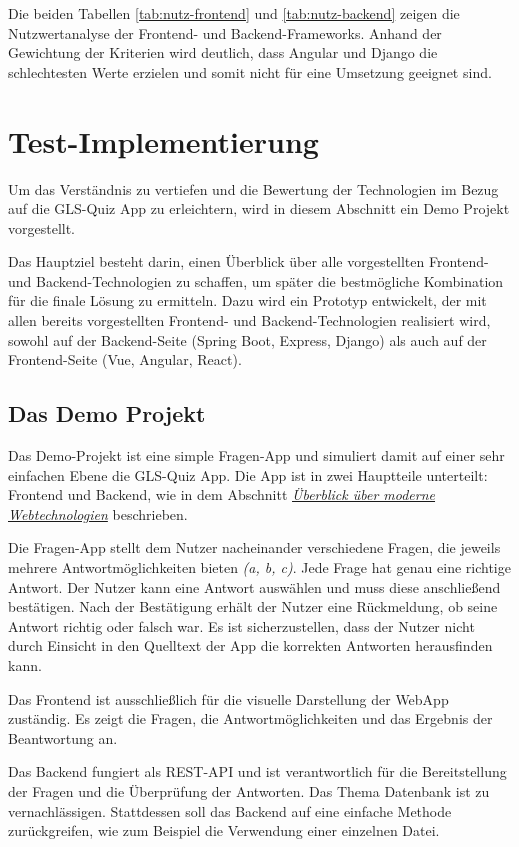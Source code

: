 \documentclass[biblatex]{lni}
\begin{document}
Die beiden Tabellen \ref{tab:nutz-frontend} und \ref{tab:nutz-backend} zeigen die Nutzwertanalyse der Frontend- und Backend-Frameworks.
Anhand der Gewichtung der Kriterien wird deutlich,
dass Angular und Django die schlechtesten Werte erzielen und somit nicht für eine Umsetzung geeignet sind.
\newpage

\section{Test-Implementierung}

Um das Verständnis zu vertiefen und die Bewertung der Technologien im Bezug auf die GLS-Quiz App zu erleichtern,
wird in diesem Abschnitt ein Demo Projekt vorgestellt.

Das Hauptziel besteht darin,
einen Überblick über alle vorgestellten Frontend- und Backend-Technologien zu schaffen,
um später die bestmögliche Kombination für die finale Lösung zu ermitteln.
Dazu wird ein Prototyp entwickelt, der mit allen bereits vorgestellten Frontend- und Backend-Technologien realisiert wird,
sowohl auf der Backend-Seite (Spring Boot, Express, Django) als auch auf der Frontend-Seite (Vue, Angular, React).

\subsection{Das Demo Projekt}

Das Demo-Projekt ist eine simple Fragen-App und simuliert damit auf einer sehr einfachen Ebene die GLS-Quiz App.
Die App ist in zwei Hauptteile unterteilt: Frontend und Backend, wie in dem Abschnitt \hyperref[sec:moderne-webtechnologien]{\textit{Überblick über moderne Webtechnologien}} beschrieben.

Die Fragen-App stellt dem Nutzer nacheinander verschiedene Fragen,
die jeweils mehrere Antwortmöglichkeiten bieten \textit{(a, b, c)}.
Jede Frage hat genau eine richtige Antwort.
Der Nutzer kann eine Antwort auswählen und muss diese anschließend bestätigen.
Nach der Bestätigung erhält der Nutzer eine Rückmeldung,
ob seine Antwort richtig oder falsch war.
Es ist sicherzustellen, dass der Nutzer nicht durch Einsicht in den Quelltext der App die korrekten Antworten herausfinden kann.

Das Frontend ist ausschließlich für die visuelle Darstellung der \ac{WebApp} zuständig.
Es zeigt die Fragen, die Antwortmöglichkeiten und das Ergebnis der Beantwortung an.

Das Backend fungiert als \ac{REST}-\ac{API} und ist verantwortlich für die Bereitstellung der Fragen und die Überprüfung der Antworten.
Das Thema Datenbank ist zu vernachlässigen.
Stattdessen soll das Backend auf eine einfache Methode zurückgreifen, wie zum Beispiel die Verwendung einer einzelnen Datei.
\end{document}
